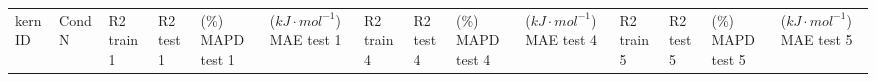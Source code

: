 \documentclass[journal=jacsat,manuscript=article]{achemso}
\begin{document}
\begin{table}[H]
    \centering
    \begin{tabular}{>{\centering\arraybackslash}p{1.0cm}>{\centering\arraybackslash}p{1.0cm}>{\centering\arraybackslash}p{0.75cm}>{\centering\arraybackslash}p{0.75cm}>{\centering\arraybackslash}p{1.0cm}>{\centering\arraybackslash}p{1.0cm}>{\centering\arraybackslash}p{0.75cm}>{\centering\arraybackslash}p{0.75cm}>{\centering\arraybackslash}p{1cm}>{\centering\arraybackslash}p{0.75cm}>{\centering\arraybackslash}p{0.75cm}>{\centering\arraybackslash}p{0.75cm}>{\centering\arraybackslash}p{1cm}>{\centering\arraybackslash}p{0.75cm}}
       \vspace{1.15cm}  kern ID& 
       \vspace{1.15cm} Cond   N& 
       \vspace{0.66cm} R2  train     1&  
 \vspace{0.66cm} R2  test   1& 
 \vspace{0.146cm} (\%) MAPD test \hspace{0.5cm}  1&  
 ($kJ \cdot mol^{-1}$) MAE test  \hspace{0.5cm}   1&  \vspace{0.66cm} R2 train   4& 
 \vspace{0.66cm} R2 test   4& 
 \vspace{0.146cm} (\%) MAPD test  \hspace{0.5cm}  4&  
 ($kJ \cdot mol^{-1}$) MAE test  \hspace{0.5cm}   4& \vspace{0.66cm} R2   train      5& 
 \vspace{0.66cm} R2   test     5& 
 \vspace{0.146cm} (\%) MAPD test  \hspace{0.5cm}   5&
 ($kJ \cdot mol^{-1}$) MAE test  \hspace{0.5cm}   5
 


\end{tabular}
\end{table}
\end{document}
